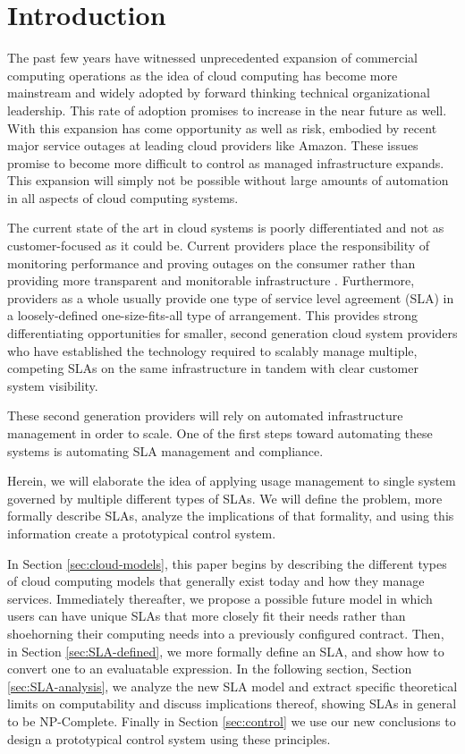 \section{Introduction}
The past few years have witnessed unprecedented expansion of commercial computing operations as the idea of cloud computing has become more mainstream and widely adopted by forward thinking technical organizational leadership.  This rate of adoption promises to increase in the near future as well.  With this expansion has come opportunity as well as risk, embodied by recent major service outages at leading cloud providers like Amazon.  These issues promise to become more difficult to control as managed infrastructure expands.  This expansion will simply not be possible without large amounts of automation in all aspects of cloud computing systems.

The current state of the art in cloud systems is poorly differentiated and not as customer-focused as it could be.  Current providers place the responsibility of monitoring performance and proving outages on the consumer rather than providing more transparent and monitorable infrastructure \cite{ctrl:amazon-cloud-watch}.  Furthermore, providers as a whole usually provide one type of service level agreement (SLA) in a loosely-defined one-size-fits-all type of arrangement.  This provides strong differentiating opportunities for smaller, second generation cloud system providers who have established the technology required to scalably manage multiple, competing SLAs on the same infrastructure in tandem with clear customer system visibility.

These second generation providers will rely on automated infrastructure management in order to scale.  One of the first steps toward automating these systems is automating SLA management and compliance.

Herein, we will elaborate the idea of applying usage management to single system governed by multiple different types of SLAs.  We will define the problem, more formally describe SLAs, analyze the implications of that formality, and using this information create a prototypical control system.

In Section \ref{sec:cloud-models}, this paper begins by describing the different types of cloud computing models that generally exist today and how they manage services.  Immediately thereafter, we propose a possible future model in which users can have unique SLAs that more closely fit their needs rather than shoehorning their computing needs into a previously configured contract.  Then, in Section \ref{sec:SLA-defined}, we more formally define an SLA, and show how to convert one to an evaluatable expression.  In the following section, Section \ref{sec:SLA-analysis}, we analyze the new SLA model and extract specific theoretical limits on computability and discuss implications thereof, showing SLAs in general to be NP-Complete.  Finally in Section \ref{sec:control} we use our new conclusions to design a prototypical control system using these principles.

